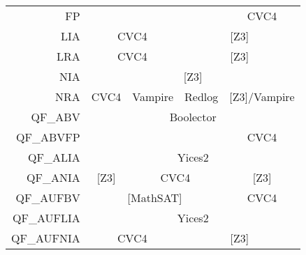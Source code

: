 \begin{table}[]
\begin{center}
{\begin{tabular}{rcccc}
FP                              & \multicolumn{1}{l}{}          & \multicolumn{1}{l}{}                & \multicolumn{1}{l|}{}         & \multicolumn{1}{c|}{CVC4}             \\ \cline{2-5} 
\multicolumn{1}{r|}{LIA}        & \multicolumn{2}{c|}{CVC4}                                           & \multicolumn{2}{c|}{{[}Z3{]}}                                         \\ \cline{2-5} 
\multicolumn{1}{r|}{LRA}        & \multicolumn{2}{c|}{CVC4}                                           & \multicolumn{2}{c|}{{[}Z3{]}}                                         \\ \cline{2-5} 
\multicolumn{1}{r|}{NIA}        & \multicolumn{4}{c|}{{[}Z3{]}}                                                                                                               \\ \cline{2-5} 
\multicolumn{1}{r|}{NRA}        & \multicolumn{1}{c|}{CVC4}     & \multicolumn{1}{c|}{Vampire}        & \multicolumn{1}{c|}{Redlog}   & \multicolumn{1}{l}{{[}Z3{]}/Vampire}  \\ \cline{2-5} 
\multicolumn{1}{r|}{QF\_ABV}    & \multicolumn{4}{c|}{Boolector}                                                                                                              \\ \cline{2-5} 
QF\_ABVFP                       & \multicolumn{1}{l}{}          & \multicolumn{1}{l}{}                & \multicolumn{1}{l|}{}         & \multicolumn{1}{c|}{CVC4}             \\ \cline{2-5} 
\multicolumn{1}{r|}{QF\_ALIA}   & \multicolumn{4}{c|}{Yices2}                                                                                                                 \\ \cline{2-5} 
\multicolumn{1}{r|}{QF\_ANIA}   & \multicolumn{1}{c|}{{[}Z3{]}} & \multicolumn{2}{c|}{CVC4}                                           & \multicolumn{1}{c|}{{[}Z3{]}}         \\ \cline{2-5} 
\multicolumn{1}{r|}{QF\_AUFBV}  & \multicolumn{3}{c|}{{[}MathSAT{]}}                                                                  & \multicolumn{1}{c|}{CVC4}             \\ \cline{2-5} 
\multicolumn{1}{r|}{QF\_AUFLIA} & \multicolumn{4}{c|}{Yices2}                                                                                                                 \\ \cline{2-5} 
\multicolumn{1}{r|}{QF\_AUFNIA} & \multicolumn{2}{c|}{CVC4}                                           & \multicolumn{2}{c|}{{[}Z3{]}}                                         \\ \cline{2-5} 

\end{tabular}}
\end{center}
\end{table}
